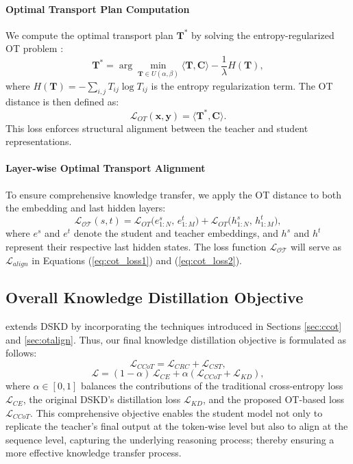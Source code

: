 \paragraph{Optimal Transport Plan Computation} 
We compute the optimal transport plan \(\mathbf{T}^*\) by solving the entropy-regularized OT problem \cite{distances2013lightspeed}:
\begin{equation}
    \mathbf{T}^* = \arg\min_{\mathbf{T} \in U(\alpha, \beta)} \langle \mathbf{T}, \mathbf{C} \rangle - \frac{1}{\lambda} H(\mathbf{T}),
\end{equation}
where \(H(\mathbf{T}) = - \sum_{i,j} T_{ij} \log T_{ij}\) is the entropy regularization term. The OT distance is then defined as:
\begin{equation}
    \mathcal{L}_{OT}(\mathbf{x}, \mathbf{y}) = \langle \mathbf{T}^*, \mathbf{C} \rangle.
\end{equation}
This loss enforces structural alignment between the teacher and student representations.

\paragraph{Layer-wise Optimal Transport Alignment} 
To ensure comprehensive knowledge transfer, we apply the OT distance to both the embedding and last hidden layers:
{\small\begin{equation}
    \mathcal{L}_{\mathcal{OT}}(s, t) = \mathcal{L}_{OT}\bigl(e^s_{1:N}, \, e^t_{1:M}\bigr) + \mathcal{L}_{OT}\bigl(h^s_{1:N}, \, h^t_{1:M}\bigr),
\end{equation}}
where \(e^s\) and \(e^t\) denote the student and teacher embeddings, and \(h^s\) and \(h^t\) represent their respective last hidden states.
The loss function $\mathcal{L}_{\mathcal{OT}}$ will serve as $\mathcal{L}_{align}$ in Equations (\ref{eq:cot_loss1}) and (\ref{eq:cot_loss2}).

\subsection{Overall Knowledge Distillation Objective}

\method extends DSKD \cite{zhang2024dual} by incorporating the techniques introduced in Sections \ref{sec:ccot} and \ref{sec:otalign}. Thus, our final knowledge distillation objective is formulated as follows:
\begin{equation}
    \mathcal{L}_{CCoT} = \mathcal{L}_{CRC} + \mathcal{L}_{CST},
\end{equation}
\begin{equation}\label{eq:final_obj}
    \mathcal{L} = (1 - \alpha) \, \mathcal{L}_{CE} + \alpha \left(\mathcal{L}_{CCoT} + \mathcal{L}_{KD}\right),
\end{equation}
where \(\alpha \in [0,1]\) balances the contributions of the traditional cross-entropy loss \(\mathcal{L}_{CE}\), the original DSKD's distillation loss \(\mathcal{L}_{KD}\), and the proposed OT-based loss $\mathcal{L}_{CCoT}$. This comprehensive objective enables the student model not only to replicate the teacher's final output at the token-wise level but also to align at the sequence level, capturing the underlying reasoning process; thereby ensuring a more effective knowledge transfer process.


